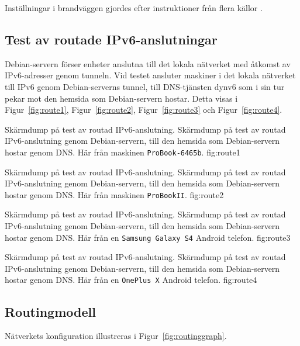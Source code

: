 Inställningar i brandväggen gjordes efter instruktioner från flera källor
\cite{ipv6:settingup} \cite{debian:networkconfig}
\cite{ipv6:tunnelswithdebian}.


\subsection{Test av routade IPv6-anslutningar}
Debian-servern förser enheter anslutna till det lokala nätverket med åtkomst av
IPv6-adresser genom tunneln. Vid testet ansluter maskiner i det lokala
nätverket till IPv6 genom Debian-serverns tunnel, till DNS-tjänsten dynv6 som 
i sin tur pekar mot den hemsida som Debian-servern hostar.  Detta
visas i Figur~\ref{fig:route1}, Figur~\ref{fig:route2}, Figur~\ref{fig:route3}
och Figur~\ref{fig:route4}.

           {Skärmdump på test av routad IPv6-anslutning.}
           {Skärmdump på test av routad IPv6-anslutning genom Debian-servern, 
            till den hemsida som Debian-servern hostar genom DNS.
            Här från maskinen \texttt{ProBook-6465b}.}
           {fig:route1}

           {Skärmdump på test av routad IPv6-anslutning.}
           {Skärmdump på test av routad IPv6-anslutning genom Debian-servern,
            till den hemsida som Debian-servern hostar genom DNS.  Här från
            maskinen \texttt{ProBookII}.}
           {fig:route2}

           {Skärmdump på test av routad IPv6-anslutning.}
           {Skärmdump på test av routad IPv6-anslutning genom Debian-servern,
            till den hemsida som Debian-servern hostar genom DNS.  Här från en
            \texttt{Samsung Galaxy S4} Android telefon.}
           {fig:route3}

           {Skärmdump på test av routad IPv6-anslutning.}
           {Skärmdump på test av routad IPv6-anslutning genom Debian-servern,
            till den hemsida som Debian-servern hostar genom DNS.  Här från en
            \texttt{OnePlus X} Android telefon.}
           {fig:route4}


\subsection{Routingmodell}
Nätverkets konfiguration illustreras i Figur~\ref{fig:routinggraph}.

